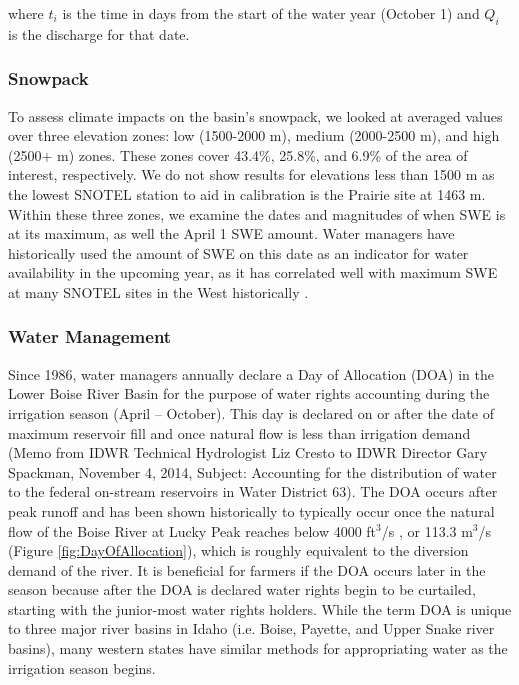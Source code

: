 \documentclass[11pt,letterpaper]{article}
\begin{document}
where $t_i$ is the time in days from the start of the water year (October 1) and $Q_i$ is the discharge for that date. 

\subsubsection{Snowpack}

To assess climate impacts on the basin’s snowpack, we looked at averaged values over three elevation zones: low (1500-2000 m), medium (2000-2500 m), and high (2500+ m) zones. These zones cover 43.4\%, 25.8\%, and 6.9\% of the area of interest, respectively. We do not show results for elevations less than 1500 m as the lowest SNOTEL station to aid in calibration is the Prairie site at 1463 m. Within these three zones, we examine the dates and magnitudes of when SWE is at its maximum, as well the April 1 SWE amount. Water managers have historically used the amount of SWE on this date as an indicator for water availability in the upcoming year, as it has correlated well with maximum SWE at many SNOTEL sites in the West historically \citep{Bohr:2001bc}.

\subsubsection{Water Management}

Since 1986, water managers annually declare a Day of Allocation (DOA) in the Lower Boise River Basin for the purpose of water rights accounting during the irrigation season (April – October). This day is declared on or after the date of maximum reservoir fill and once natural flow is less than irrigation demand (Memo from IDWR Technical Hydrologist Liz Cresto to IDWR Director Gary Spackman, November 4, 2014, Subject: Accounting for the distribution of water to the federal on-stream reservoirs in Water District 63). The DOA occurs after peak runoff and has been shown historically to typically occur once the natural flow of the Boise River at Lucky Peak reaches below 4000 ft${}^3$/s \citep{Garst:2017bg}, or 113.3 m${}^3$/s (Figure \ref{fig:DayOfAllocation}), which is roughly equivalent to the diversion demand of the river. It is beneficial for farmers if the DOA occurs later in the season because after the DOA is declared water rights begin to be curtailed, starting with the junior-most water rights holders. While the term DOA is unique to three major river basins in Idaho (i.e. Boise, Payette, and Upper Snake river basins), many western states have similar methods for appropriating water as the irrigation season begins.
\end{document}
